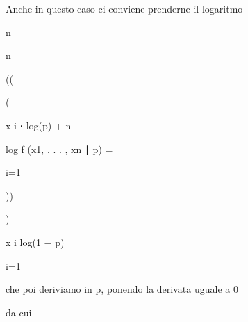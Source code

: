 \documentclass[a4paper,portrait,12pt]{article}
\begin{document}
\begin{flushleft}
Anche in questo caso ci conviene prenderne il logaritmo
\end{flushleft}


\begin{flushleft}
n
\end{flushleft}





\begin{flushleft}
n
\end{flushleft}





((


(





\begin{flushleft}
x i ⋅ log(p) + n $-$
\end{flushleft}





\begin{flushleft}
log f (x1, . . . , xn ∣ p) =
\end{flushleft}


\begin{flushleft}
i=1
\end{flushleft}





))


)





\begin{flushleft}
x i log(1 $-$ p)
\end{flushleft}


\begin{flushleft}
i=1
\end{flushleft}





\begin{flushleft}
che poi deriviamo in p, ponendo la derivata uguale a 0
\end{flushleft}





\begin{flushleft}
da cui
\end{flushleft}
\end{document}
